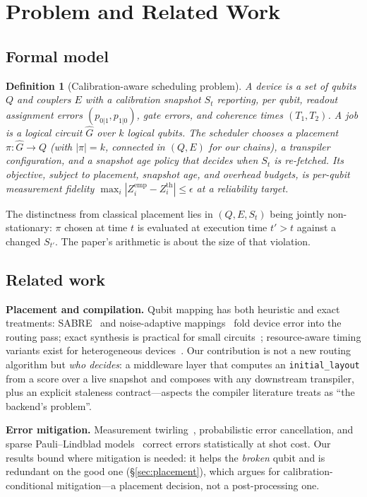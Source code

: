 \documentclass[journal,10pt,twocolumn]{IEEEtran}
\newtheorem{definition}{Definition}
\begin{document}
\section{Problem and Related Work}
\subsection{Formal model}
\begin{definition}[Calibration-aware scheduling problem]
A device is a set of qubits $Q$ and couplers $E$ with a calibration snapshot $S_t$ reporting, per qubit, readout
assignment errors $(p_{0|1},p_{1|0})$, gate errors, and coherence times $(T_1,T_2)$. A job is a logical circuit
$\hat{G}$ over $k$ logical qubits. The scheduler chooses a \emph{placement} $\pi:\hat{G}\to Q$ (with
$|\pi|=k$, connected in $(Q,E)$ for our chains), a transpiler configuration, and a \emph{snapshot age policy}
that decides when $S_t$ is re-fetched. Its objective, subject to placement, snapshot age, and overhead budgets, is
per-qubit measurement fidelity $\max_i|Z_i^{\mathrm{emp}}\!\!-\!Z_i^{\mathrm{th}}|\!\le\!\epsilon$ at a
reliability target.
\end{definition}
The distinctness from classical placement lies in $(Q,E,S_t)$ being jointly non-stationary: $\pi$ chosen at time $t$
is evaluated at execution time $t'>t$ against a changed $S_{t'}$. The paper's arithmetic is about the size of that
violation.

\subsection{Related work}
\textbf{Placement and compilation.} Qubit mapping has both heuristic and exact treatments: SABRE~\cite{li2019sabre}
and noise-adaptive mappings~\cite{murali2019noise} fold device error into the routing pass; exact synthesis is
practical for small circuits~\cite{tan2020iccado}; resource-aware timing variants exist for heterogeneous
devices~\cite{lao2022timing}. Our contribution is not a new routing algorithm but \emph{who decides}: a middleware
layer that computes an \texttt{initial\_layout} from a score over a live snapshot and composes with any downstream
transpiler, plus an explicit staleness contract---aspects the compiler literature treats as ``the backend's
problem''.

\textbf{Error mitigation.} Measurement twirling~\cite{nation2023,bravyi2021meas}, probabilistic error cancellation,
and sparse Pauli--Lindblad models~\cite{vanberg2023,temme2017} correct errors statistically at shot cost. Our results
bound where mitigation is needed: it helps the \emph{broken} qubit and is redundant on the good one
(\S\ref{sec:placement}), which argues for calibration-conditional mitigation---a placement decision, not a
post-processing one.
\end{document}
